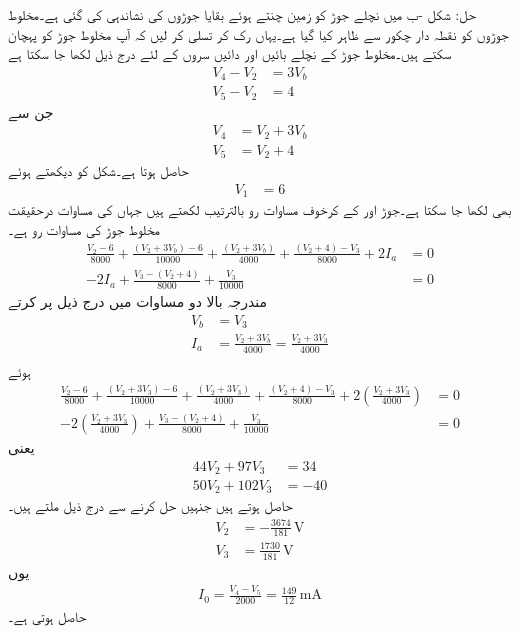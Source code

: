 حل: شکل -ب میں  نچلے جوڑ کو زمین چنتے ہوئے  بقایا جوڑوں کی نشاندہی کی گئی ہے۔مخلوط جوڑوں کو نقطہ دار چکور سے ظاہر کیا گیا ہے۔یہاں رک کر تسلی کر لیں کہ آپ مخلوط جوڑ کو پہچان سکتے ہیں۔مخلوط جوڑ کے نچلے بائیں اور دائیں سروں کے لئے درج ذیل لکھا جا سکتا ہے
\begin{align*}
V_4-V_2&=3V_b\\
V_5-V_2&=4
\end{align*}
جن  سے
\begin{align*}
V_4&=V_2+3V_b\\
V_5&=V_2+4
\end{align*}
حاصل ہوتا ہے۔شکل کو دیکھتے ہوئے
\begin{align*}
V_1&=6
\end{align*}
بھی لکھا جا سکتا ہے۔جوڑ  اور  کے کرخوف مساوات رو بالترتیب لکھتے ہیں جہاں  کی مساوات درحقیقت مخلوط جوڑ کی مساوات رو ہے۔
\begin{align*}
\frac{V_2-6}{8000}+\frac{(V_2+3V_b)-6}{10000}+\frac{(V_2+3V_b)}{4000}+\frac{(V_2+4)-V_3}{8000}+2I_a&=0\\
-2I_a+\frac{V_3-(V_2+4)}{8000}+\frac{V_3}{10000}&=0
\end{align*}
مندرجہ بالا دو مساوات میں درج ذیل پر کرتے
\begin{align*}
V_b&=V_3\\
I_a&=\frac{V_2+3V_b}{4000}=\frac{V_2+3V_3}{4000}\\
\end{align*}
ہوئے
\begin{align*}
\frac{V_2-6}{8000}+\frac{(V_2+3V_3)-6}{10000}+\frac{(V_2+3V_3)}{4000}+\frac{(V_2+4)-V_3}{8000}+2\left(\frac{V_2+3V_3}{4000}\right)&=0\\
-2\left(\frac{V_2+3V_3}{4000}\right)+\frac{V_3-(V_2+4)}{8000}+\frac{V_3}{10000}&=0
\end{align*}
یعنی
\begin{align*}
44V_2+97V_3&=34\\
50V_2+102V_3&=-40
\end{align*}
حاصل ہوتے ہیں جنہیں حل کرنے سے درج ذیل ملتے ہیں۔
\begin{align*}
V_2&=-\frac{3674}{181} \, \si{\volt}\\
V_3&=\frac{1730}{181} \, \si{\volt}
\end{align*}
یوں
\begin{align*}
I_0=\frac{V_4-V_5}{2000}=\frac{149}{12}\,\si{\milli\ampere}
\end{align*}
حاصل ہوتی ہے۔

